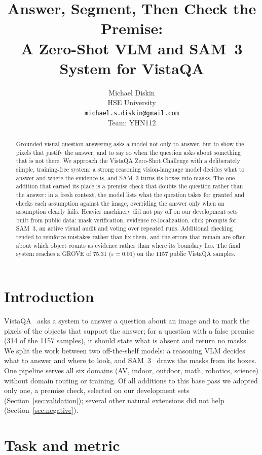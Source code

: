 \documentclass{article}
\title{Answer, Segment, Then Check the Premise:\\A Zero-Shot VLM and SAM~3 System for VistaQA}
\author{%
  Michael Diskin \\
  HSE University \\
  \texttt{michael.s.diskin@gmail.com} \\
  Team: YHN112
}
\begin{document}
\maketitle

\begin{abstract}
  Grounded visual question answering asks a model not only to answer, but to show the pixels that justify the answer,
  and to say so when the question asks about something that is not there.
  We approach the VistaQA Zero-Shot Challenge with a deliberately simple, training-free system:
  a strong reasoning vision-language model decides what to answer and where the evidence is,
  and SAM~3 turns its boxes into masks.
  The one addition that earned its place is a premise check that doubts the question rather than the answer:
  in a fresh context, the model lists what the question takes for granted and checks each assumption against the image,
  overriding the answer only when an assumption clearly fails.
  Heavier machinery did not pay off on our development sets built from public data:
  mask verification, evidence re-localization, click prompts for SAM~3, an active visual audit and voting over repeated runs.
  Additional checking tended to reinforce mistakes rather than fix them,
  and the errors that remain are often about which object counts as evidence rather than where its boundary lies.
  The final system reaches a GROVE of 75.31 ($\varepsilon=0.01$) on the 1157 public VistaQA samples.
\end{abstract}

\section{Introduction}

VistaQA~\citep{vistaqa} asks a system to answer a question about an image
and to mark the pixels of the objects that support the answer;
for a question with a false premise (314 of the 1157 samples), it should state what is absent and return no masks.
We split the work between two off-the-shelf models:
a reasoning VLM decides what to answer and where to look, and SAM~3~\citep{sam3} draws the masks from its boxes.
One pipeline serves all six domains (AV, indoor, outdoor, math, robotics, science) without domain routing or training.
Of all additions to this base pass we adopted only one, a premise check, selected on our development sets (Section~\ref{sec:validation});
several other natural extensions did not help (Section~\ref{sec:negative}).

\section{Task and metric}
\label{sec:task}
\end{document}
